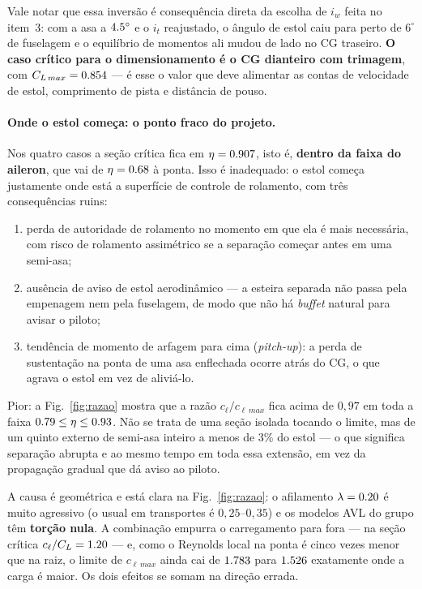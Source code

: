 Vale notar que essa inversão é consequência direta da escolha de $i_w$ feita no
item~3: com a asa a $4.5^\circ$ e o $i_t$ reajustado, o ângulo de estol caiu
para perto de $6^\circ$ de fuselagem e o equilíbrio de momentos ali mudou de
lado no CG traseiro. \textbf{O caso crítico para o dimensionamento é o CG
dianteiro com trimagem}, com $C_{L\,max} = 0.854$ --- é esse o valor
que deve alimentar as contas de velocidade de estol, comprimento de pista e
distância de pouso.

\paragraph{Onde o estol começa: o ponto fraco do projeto.}
Nos quatro casos a seção crítica fica em $\eta = 0.907$, isto é,
\textbf{dentro da faixa do aileron}, que vai de $\eta=0.68$ à ponta. Isso é
inadequado: o estol começa justamente onde está a superfície de controle de
rolamento, com três consequências ruins:
\begin{enumerate}
  \item perda de autoridade de rolamento no momento em que ela é mais
  necessária, com risco de rolamento assimétrico se a separação começar antes
  em uma semi-asa;
  \item ausência de aviso de estol aerodinâmico --- a esteira separada não passa
  pela empenagem nem pela fuselagem, de modo que não há \emph{buffet} natural
  para avisar o piloto;
  \item tendência de momento de arfagem para cima (\emph{pitch-up}): a perda de
  sustentação na ponta de uma asa enflechada ocorre atrás do CG, o que agrava o
  estol em vez de aliviá-lo.
\end{enumerate}

Pior: a Fig.~\ref{fig:razao} mostra que a razão $c_\ell/c_{\ell\,max}$ fica
acima de $0{,}97$ em toda a faixa
$0.79 \leq \eta \leq 0.93$. Não se trata de uma seção isolada
tocando o limite, mas de um quinto externo de semi-asa inteiro a menos de 3\%
do estol --- o que significa separação abrupta e ao mesmo tempo em toda essa
extensão, em vez da propagação gradual que dá aviso ao piloto.

A causa é geométrica e está clara na Fig.~\ref{fig:razao}: o afilamento
$\lambda = 0.20$ é muito agressivo (o usual em transportes é
$0{,}25$--$0{,}35$) e os modelos AVL do grupo têm \textbf{torção nula}. A
combinação empurra o carregamento para fora --- na seção crítica
$c_\ell/C_L = 1.20$ --- e, como o Reynolds local na ponta é cinco vezes
menor que na raiz, o limite de $c_{\ell\,max}$ ainda cai de $1.783$ para
$1.526$ exatamente onde a carga é maior. Os dois efeitos se somam na
direção errada.

